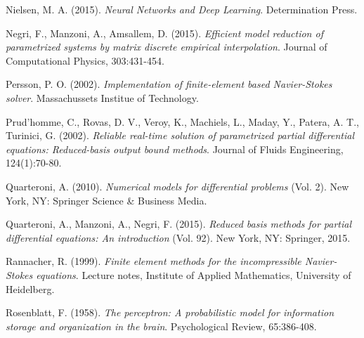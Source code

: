 \documentclass{elsarticle}
\numberwithin{equation}{section}
\theoremstyle{theorem}
\theoremstyle{definition}
\theoremstyle{remark}
\theoremstyle{proposition}
\numberwithin{figure}{section}
\begin{document}
\begin{thebibliography}{50}
						
		
		Nielsen, M. A. (2015). \emph{Neural Networks and Deep Learning}. Determination Press.
				
		Negri, F., Manzoni, A., Amsallem, D. (2015). \emph{Efficient model reduction of parametrized systems by matrix discrete empirical interpolation}. Journal of Computational Physics, 303:431-454.
		
		Persson, P. O. (2002). \emph{Implementation of finite-element based Navier-Stokes solver}. Massachussets Institue of Technology.
		
		Prud'homme, C., Rovas, D. V., Veroy, K., Machiels, L., Maday, Y., Patera, A. T., Turinici, G. (2002). \emph{Reliable real-time solution of parametrized partial differential equations: Reduced-basis output bound methods}. Journal of Fluids Engineering, 124(1):70-80.
		
		Quarteroni, A. (2010). \emph{Numerical models for differential problems} (Vol. 2). New York, NY: Springer Science \& Business Media.
		
		Quarteroni, A., Manzoni, A., Negri, F. (2015). \emph{Reduced basis methods for partial differential equations: An introduction} (Vol. 92). New York, NY: Springer, 2015.
		
		Rannacher, R. (1999). \emph{Finite element methods for the incompressible Navier-Stokes equations}. Lecture notes, Institute of Applied Mathematics, University of Heidelberg.
		
		
		Rosenblatt, F. (1958). \emph{The perceptron: A probabilistic model for information storage and organization in the brain}. Psychological Review, 65:386-408.
		
		

\end{thebibliography}
\end{document}
